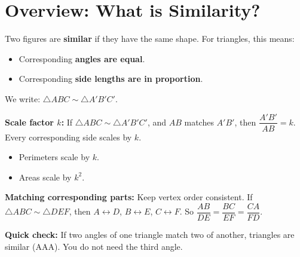\documentclass[11pt,a4paper]{article}
\begin{document}
\section*{Overview: What is Similarity?}
\begin{multicols}{2}
\begin{definitionbox}
Two figures are \textbf{similar} if they have the same shape. For triangles, this means:
\begin{itemize}
  \item Corresponding \textbf{angles are equal}.
  \item Corresponding \textbf{side lengths are in proportion}.
\end{itemize}
We write: $\triangle ABC \sim \triangle A'B'C'$.
\end{definitionbox}

\begin{propertybox}
\textbf{Scale factor $k$:} If $\triangle ABC \sim \triangle A'B'C'$, and $AB$ matches $A'B'$, then $\dfrac{A'B'}{AB} = k$. Every corresponding side scales by $k$.
\begin{itemize}
  \item Perimeters scale by $k$.
  \item Areas scale by $k^2$.
\end{itemize}
\end{propertybox}

\begin{examplebox}
\textbf{Matching corresponding parts:} Keep vertex order consistent. If $\triangle ABC \sim \triangle DEF$, then $A\leftrightarrow D$, $B\leftrightarrow E$, $C\leftrightarrow F$. So $\dfrac{AB}{DE}=\dfrac{BC}{EF}=\dfrac{CA}{FD}$.
\end{examplebox}

\begin{shortcutbox}
\textbf{Quick check:} If two angles of one triangle match two of another, triangles are similar (AAA). You do not need the third angle.
\end{shortcutbox}

\begin{center}
\end{center}
\end{multicols}
\end{document}
